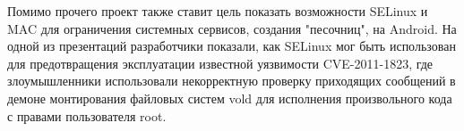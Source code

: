 Помимо прочего проект также ставит цель показать возможности SELinux и
MAC для ограничения системных сервисов, создания "песочниц", на Android.
На одной из презентаций разработчики показали, как SELinux мог быть
использован для предотвращения эксплуатации известной уязвимости
CVE-2011-1823, где злоумышленники использовали некорректную проверку
приходящих сообщений в демоне монтирования файловых систем vold для
исполнения произвольного кода с правами пользователя root.

\newpage

